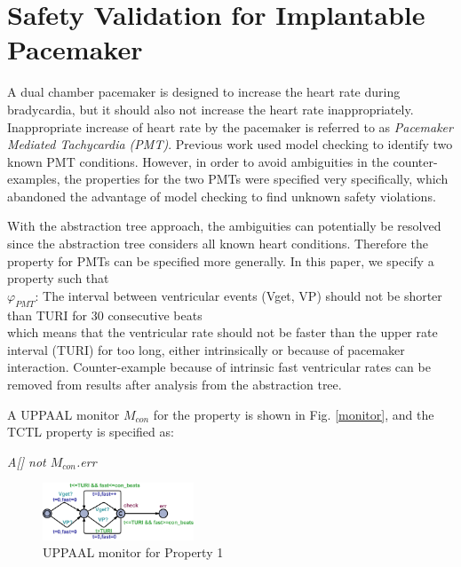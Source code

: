 \section{Safety Validation for Implantable Pacemaker}
A dual chamber pacemaker is designed to increase the heart rate during bradycardia, but it should also not increase the heart rate inappropriately.
Inappropriate increase of heart rate by the pacemaker is referred to as \emph{Pacemaker Mediated Tachycardia (PMT)}.
Previous work \cite{sttt13} used model checking to identify two known PMT conditions.
However, in order to avoid ambiguities in the counter-examples, the properties for the two PMTs were specified very specifically, which abandoned the advantage of model checking to find unknown safety violations.

With the abstraction tree approach, the ambiguities can potentially be resolved since the abstraction tree considers all known heart conditions.
Therefore the property for PMTs can be specified more generally.
In this paper, we specify a property such that\\
$\varphi_{PMT}$: The interval between ventricular events (Vget, VP) should not be shorter than TURI for 30 consecutive beats\\
which means that the ventricular rate should not be faster than the upper rate interval (TURI) for too long, either intrinsically or because of pacemaker interaction.
Counter-example because of intrinsic fast ventricular rates can be removed from results after analysis from the abstraction tree.

A UPPAAL monitor $M_{con}$ for the property is shown in Fig. \ref{monitor}, and the TCTL property is specified as:\\
\begin{center}
\emph{A[] not $M_{con}$.err}
\end{center}

\begin{figure}[!t]
	\centering
	\includegraphics[width=0.4\textwidth]{figs/monitor.png}
	\caption{\small UPPAAL monitor for Property 1}
	\label{fig:monitor}
\end{figure}

